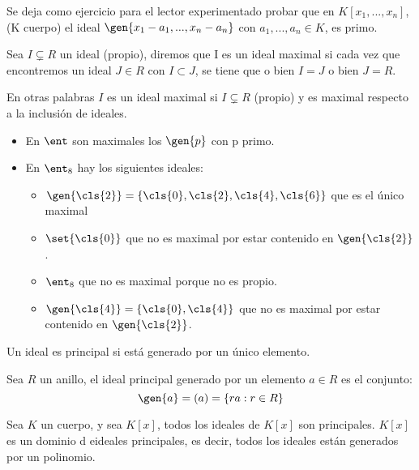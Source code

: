 Se deja como ejercicio para el lector experimentado probar que en $K[x_1,...,x_n]$, (K cuerpo) el ideal $\gen{x_1-a_1,...,x_n-a_n}$ con $a_1,...,a_n \in K$, es primo.

\begin{defn} \label{def:IdealMaximal}
	Sea $I \subsetneq R$ un ideal (propio), diremos que I es un ideal maximal si cada vez que encontremos un ideal $J \in R$ con $I \subset J$, se tiene que o bien $I=J$ o bien $J=R$.

	En otras palabras $I$ es un ideal maximal si $I \subsetneq R$  (propio) y es maximal respecto a la inclusión de ideales.
\end{defn}

\begin{example}
	\begin{itemize}
		\item En $\ent$ son maximales los $\gen{p}$ con p primo.
		\item En $\ent_8$ hay los siguientes ideales:
		\begin{itemize}
			\item $\gen{\cls{2}}=\{\cls{0},\cls{2},\cls{4},\cls{6} \}$ que es el único maximal
			\item $\set{\cls{0}}$ que no es maximal por estar contenido en $\gen{\cls{2}}$.
			\item $\ent_8$ que no es maximal porque no es propio.
			\item $\gen{\cls{4}}=\{\cls{0},\cls{4} \}$ que no es maximal por estar contenido en $\gen{\cls{2}}$.
		\end{itemize}
	\end{itemize}
\end{example}

\begin{defn}
	Un ideal es principal si está generado por un único elemento.
\end{defn}

\begin{example}
	Sea $R$ un anillo, el ideal principal generado por un elemento $a \in R$ es el conjunto:
	$$ \gen{a}=(a)=\{ra: r \in R \} $$
\end{example}

\begin{prop}
	Sea $K$ un cuerpo, y sea $K[x]$, todos los ideales de $K[x]$ son principales. $K[x]$ es un dominio d eideales principales, es decir, todos los ideales están generados por un polinomio.
\end{prop}

